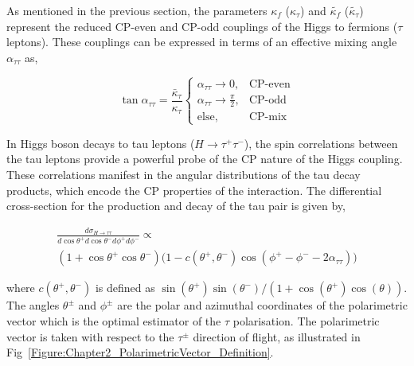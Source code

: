 As mentioned in the previous section, the parameters $\kappa_f$ ($\kappa_\tau$) and $\tilde{\kappa_f}$ ($\tilde{\kappa_\tau}$) represent the reduced CP-even and CP-odd couplings of the Higgs to fermions ($\tau$ leptons). These couplings can be expressed in terms of an effective mixing angle $\alpha_{\tau\tau}$ as,

\begin{equation}
\tan \alpha_{\tau\tau} = \frac{\bar{\kappa}_\tau}{\kappa_\tau} 
\begin{cases}
    \alpha_{\tau\tau} \to 0, & \text{CP-even} \\
    \alpha_{\tau\tau} \to \frac{\pi}{2}, & \text{CP-odd} \\
    \text{else}, & \text{CP-mix}
\end{cases}
\end{equation}

In Higgs boson decays to tau leptons (\(H \to \tau^+ \tau^-\)), the spin correlations between the tau leptons provide a powerful probe of the CP nature of the Higgs coupling. These correlations manifest in the angular distributions of the tau decay products, which encode the CP properties of the interaction. The differential cross-section for the production and decay of the tau pair is given by,

\begin{equation}
\begin{array}{c}
{\displaystyle
\frac{d\sigma_{H\to\tau\tau}}{d\cos\theta^+ d\cos\theta^- d\phi^+ d\phi^-} \propto
} \\[10pt]
{\displaystyle
(1 + \cos\theta^+ \cos\theta^-) \Big(1 - c(\theta^+, \theta^-) \cos(\phi^+ - \phi^- - 2\alpha_{\tau\tau})\Big)
}
\end{array}
\label{Equation:Chapter2_TauDifferentialXS}
\end{equation}

where $c(\theta^+, \theta^-)$ is defined as $\sin(\theta^+)\sin(\theta^-)/(1+\cos(\theta^+)\cos(\theta))$. The angles $\theta^\pm$ and $\phi^\pm$ are the polar and azimuthal coordinates of the polarimetric vector which is the optimal estimator of the $\tau$ polarisation. The polarimetric vector is taken with respect to the $\tau^\pm$ direction of flight, as illustrated in Fig~\ref{Figure:Chapter2_PolarimetricVector_Definition}.

